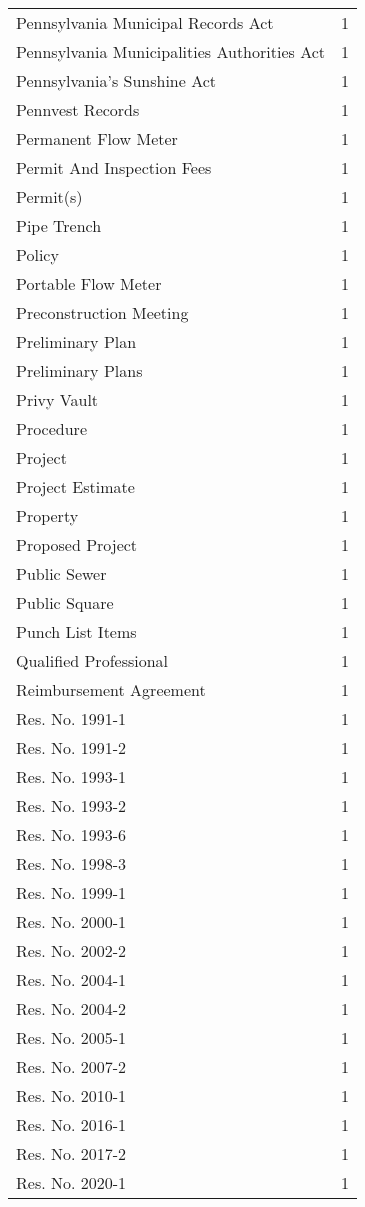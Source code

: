 \begin{longtable}{p{} p{}}
Pennsylvania Municipal Records Act & 1 \\
Pennsylvania Municipalities Authorities Act & 1 \\
Pennsylvania's Sunshine Act & 1 \\
Pennvest Records & 1 \\
Permanent Flow Meter & 1 \\
Permit And Inspection Fees & 1 \\
Permit(s) & 1 \\
Pipe Trench & 1 \\
Policy & 1 \\
Portable Flow Meter & 1 \\
Preconstruction Meeting & 1 \\
Preliminary Plan & 1 \\
Preliminary Plans & 1 \\
Privy Vault & 1 \\
Procedure & 1 \\
Project & 1 \\
Project Estimate & 1 \\
Property & 1 \\
Proposed Project & 1 \\
Public Sewer & 1 \\
Public Square & 1 \\
Punch List Items & 1 \\
Qualified Professional & 1 \\
Reimbursement Agreement & 1 \\
Res. No. 1991-1 & 1 \\
Res. No. 1991-2 & 1 \\
Res. No. 1993-1 & 1 \\
Res. No. 1993-2 & 1 \\
Res. No. 1993-6 & 1 \\
Res. No. 1998-3 & 1 \\
Res. No. 1999-1 & 1 \\
Res. No. 2000-1 & 1 \\
Res. No. 2002-2 & 1 \\
Res. No. 2004-1 & 1 \\
Res. No. 2004-2 & 1 \\
Res. No. 2005-1 & 1 \\
Res. No. 2007-2 & 1 \\
Res. No. 2010-1 & 1 \\
Res. No. 2016-1 & 1 \\
Res. No. 2017-2 & 1 \\
Res. No. 2020-1 & 1 \\

\end{longtable}

